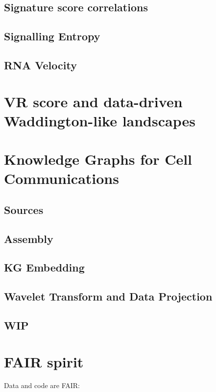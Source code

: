 \subsection*{Signature score correlations}

\subsection*{Signalling Entropy}

\subsection*{RNA Velocity}

\section{VR score and data-driven Waddington-like landscapes}

\section{Knowledge Graphs for Cell Communications}

\subsection*{Sources}

\subsection*{Assembly}

\subsection*{KG Embedding}

\subsection*{Wavelet Transform and Data Projection}

\subsection*{WIP}

\section{FAIR spirit}

Data and code are FAIR:

